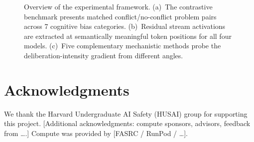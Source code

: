 \documentclass[accepted]{article}
\begin{document}
\begin{figure}[t]
\centering
\caption{Overview of the experimental framework.  (a)~The contrastive
  benchmark presents matched conflict/no-conflict problem pairs across 7
  cognitive bias categories.  (b)~Residual stream activations are extracted
  at semantically meaningful token positions for all four models.
  (c)~Five complementary mechanistic methods probe the deliberation-intensity
  gradient from different angles.}
\label{fig:overview}
\end{figure}









\section*{Acknowledgments}

We thank the Harvard Undergraduate AI Safety (HUSAI) group for supporting
this project.  [Additional acknowledgments: compute sponsors, advisors,
feedback from \ldots.]  Compute was provided by [FASRC / RunPod / \ldots].






\newpage

\end{document}
